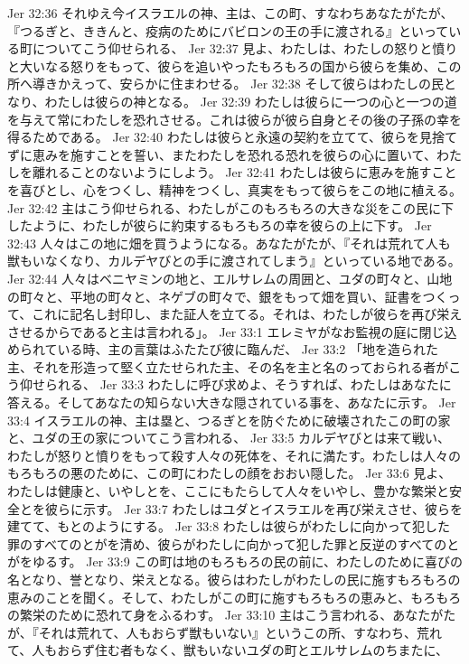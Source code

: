 Jer 32:36  それゆえ今イスラエルの神、主は、この町、すなわちあなたがたが、『つるぎと、ききんと、疫病のためにバビロンの王の手に渡される』といっている町についてこう仰せられる、
Jer 32:37  見よ、わたしは、わたしの怒りと憤りと大いなる怒りをもって、彼らを追いやったもろもろの国から彼らを集め、この所へ導きかえって、安らかに住まわせる。
Jer 32:38  そして彼らはわたしの民となり、わたしは彼らの神となる。
Jer 32:39  わたしは彼らに一つの心と一つの道を与えて常にわたしを恐れさせる。これは彼らが彼ら自身とその後の子孫の幸を得るためである。
Jer 32:40  わたしは彼らと永遠の契約を立てて、彼らを見捨てずに恵みを施すことを誓い、またわたしを恐れる恐れを彼らの心に置いて、わたしを離れることのないようにしよう。
Jer 32:41  わたしは彼らに恵みを施すことを喜びとし、心をつくし、精神をつくし、真実をもって彼らをこの地に植える。
Jer 32:42  主はこう仰せられる、わたしがこのもろもろの大きな災をこの民に下したように、わたしが彼らに約束するもろもろの幸を彼らの上に下す。
Jer 32:43  人々はこの地に畑を買うようになる。あなたがたが、『それは荒れて人も獣もいなくなり、カルデヤびとの手に渡されてしまう』といっている地である。
Jer 32:44  人々はベニヤミンの地と、エルサレムの周囲と、ユダの町々と、山地の町々と、平地の町々と、ネゲブの町々で、銀をもって畑を買い、証書をつくって、これに記名し封印し、また証人を立てる。それは、わたしが彼らを再び栄えさせるからであると主は言われる」。
Jer 33:1  エレミヤがなお監視の庭に閉じ込められている時、主の言葉はふたたび彼に臨んだ、
Jer 33:2  「地を造られた主、それを形造って堅く立たせられた主、その名を主と名のっておられる者がこう仰せられる、
Jer 33:3  わたしに呼び求めよ、そうすれば、わたしはあなたに答える。そしてあなたの知らない大きな隠されている事を、あなたに示す。
Jer 33:4  イスラエルの神、主は塁と、つるぎとを防ぐために破壊されたこの町の家と、ユダの王の家についてこう言われる、
Jer 33:5  カルデヤびとは来て戦い、わたしが怒りと憤りをもって殺す人々の死体を、それに満たす。わたしは人々のもろもろの悪のために、この町にわたしの顔をおおい隠した。
Jer 33:6  見よ、わたしは健康と、いやしとを、ここにもたらして人々をいやし、豊かな繁栄と安全とを彼らに示す。
Jer 33:7  わたしはユダとイスラエルを再び栄えさせ、彼らを建てて、もとのようにする。
Jer 33:8  わたしは彼らがわたしに向かって犯した罪のすべてのとがを清め、彼らがわたしに向かって犯した罪と反逆のすべてのとがをゆるす。
Jer 33:9  この町は地のもろもろの民の前に、わたしのために喜びの名となり、誉となり、栄えとなる。彼らはわたしがわたしの民に施すもろもろの恵みのことを聞く。そして、わたしがこの町に施すもろもろの恵みと、もろもろの繁栄のために恐れて身をふるわす。
Jer 33:10  主はこう言われる、あなたがたが、『それは荒れて、人もおらず獣もいない』というこの所、すなわち、荒れて、人もおらず住む者もなく、獣もいないユダの町とエルサレムのちまたに、
